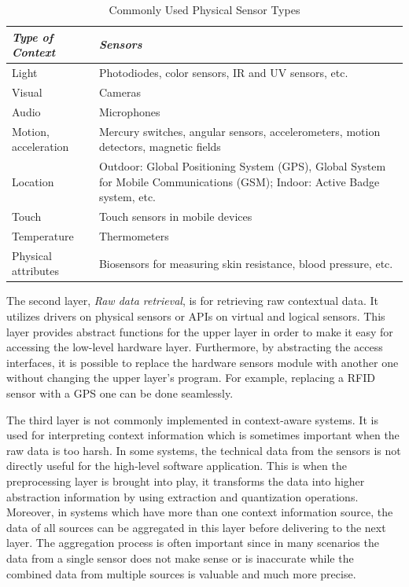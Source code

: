 \begin{table}
    \centering
    \begin{tabular}{ | l | p{7cm} |}
    \hline
    \textit{Type of Context} & \textit{Sensors} \\ \hline
    Light & Photodiodes, color sensors, IR and UV sensors, etc. \\ \hline
    Visual & Cameras \\ \hline
    Audio & Microphones \\ \hline
    Motion, acceleration & Mercury switches, angular sensors, accelerometers, motion detectors, magnetic fields \\ \hline
    Location & Outdoor: Global Positioning System (GPS), Global System for Mobile Communications (GSM); Indoor: Active Badge system, etc. \\ \hline
    Touch & Touch sensors in mobile devices \\ \hline
    Temperature & Thermometers \\ \hline
    Physical attributes & Biosensors for measuring skin resistance, blood pressure, etc. \\ \hline
    \end{tabular}
    \caption{Commonly Used Physical Sensor Types} \label{tb:sensor_types}
\end{table}

The second layer, \textit{Raw data retrieval}, is for retrieving raw contextual data. It utilizes drivers on physical sensors or APIs on virtual and logical sensors. This layer provides abstract functions for the upper layer in order to make it easy for accessing the low-level hardware layer. Furthermore, by abstracting the access interfaces, it is possible to replace the hardware sensors module with another one without changing the upper layer's program. For example, replacing a RFID sensor with a GPS one can be done seamlessly.

The third layer is not commonly implemented in context-aware systems. It is used for interpreting context information which is sometimes important when the raw data is too harsh. In some systems, the technical data from the sensors is not directly useful for the high-level software application. This is when the preprocessing layer is brought into play, it transforms the data into higher abstraction information by using extraction and quantization operations. Moreover, in systems which have more than one context information source, the data of all sources can be aggregated in this layer before delivering to the next layer. The aggregation process is often important since in many scenarios the data from a single sensor does not make sense or is inaccurate while the combined data from multiple sources is valuable and much more precise.

